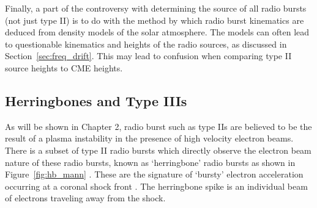 Finally, a part of the controversy with determining the source of all radio bursts (not just type II) is to do with the method by which radio burst kinematics are deduced from density models of the solar atmosphere. The models can often lead to questionable kinematics and heights of the radio sources, as discussed in Section~\ref{sec:freq_drift}. This may lead to confusion when comparing type II source heights to CME heights.

\subsection{Herringbones and Type IIIs}

As will be shown in Chapter 2, radio burst such as type IIs are believed to be the result of a plasma instability in the presence of high velocity electron beams. There is a subset of type II radio bursts which directly observe the electron beam nature of these radio bursts, known as `herringbone' radio bursts as shown in Figure~\ref{fig:hb_mann} \citep{cairns1987, cane1998}. These are the signature of `bursty' electron acceleration occurring at a coronal shock front \citep{mann2005}. The herringbone spike is an individual beam of electrons traveling away from the shock. 

